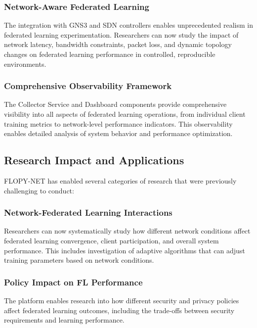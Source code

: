 \subsubsection{Network-Aware Federated Learning}

The integration with GNS3 and SDN controllers enables unprecedented realism in federated learning experimentation. Researchers can now study the impact of network latency, bandwidth constraints, packet loss, and dynamic topology changes on federated learning performance in controlled, reproducible environments.

\subsubsection{Comprehensive Observability Framework}

The Collector Service and Dashboard components provide comprehensive visibility into all aspects of federated learning operations, from individual client training metrics to network-level performance indicators. This observability enables detailed analysis of system behavior and performance optimization.

\subsection{Research Impact and Applications}

FLOPY-NET has enabled several categories of research that were previously challenging to conduct:

\subsubsection{Network-Federated Learning Interactions}

Researchers can now systematically study how different network conditions affect federated learning convergence, client participation, and overall system performance. This includes investigation of adaptive algorithms that can adjust training parameters based on network conditions.

\subsubsection{Policy Impact on FL Performance}

The platform enables research into how different security and privacy policies affect federated learning outcomes, including the trade-offs between security requirements and learning performance.

